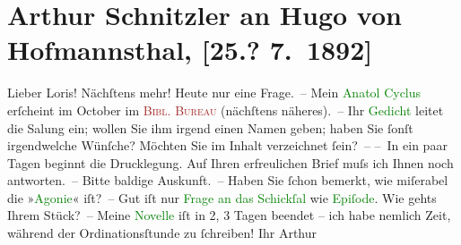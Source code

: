 

               \section[Arthur Schnitzler an Hugo von Hofmannsthal, {[}25.? 7. 1892{]}]{ Arthur Schnitzler an Hugo von Hofmannsthal, {[}25.? 7. 1892{]}}\nopagebreak{}\rehead{ }\normalsize\beginnumbering{} \toendnotes[C]{\smallbreak\pagebreak[2]} 
\toendnotes[C]{\smallbreak}\pstart
           \noindent{}{\pb}Lieber Loris! Nächſtens mehr! Heute nur
                    eine Frage. – Mein \textcolor{green}{Anatol Cyclus}{}\ledrightnote{\textcolor{green}{Anatol}} erſcheint im
                        October im \textcolor{brown}{\textsc{Bibl. Bureau}}{}\ledrightnote{\textcolor{brown}{Bibliographisches Bureau}} (nächſtens näheres). – Ihr \textcolor{green}{Gedicht}{} leitet die Sa{\geminationm}lung ein; wollen
                    Sie ihm irgend einen Namen geben; haben Sie ſonſt irgendwelche Wünſche? Möchten
                    Sie im {\pb}Inhalt verzeichnet ſein? –\pend
           \pstart
           – In ein paar Tagen beginnt die Drucklegung.\pend
           \pstart
           Auf Ihren erfreulichen Brief muſs ich Ihnen noch antworten. – Bitte baldige
                    Auskunft. – Haben Sie ſchon bemerkt, wie miſerabel die »\textcolor{green}{Agonie}{}\ledrightnote{\textcolor{green}{Agonie}}« iſt? – Gut iſt nur {\pb}\textcolor{green}{Frage an das Schickſal}{}\ledrightnote{\textcolor{green}{Die Frage an das Schicksal}} wie \textcolor{green}{Epiſode}{}\ledrightnote{\textcolor{green}{Episode}}.\pend
           \pstart
           Wie gehts Ihrem Stück? –\pend
           \pstart
           Meine \textcolor{green}{Novelle}{} iſt in 2, 3
                    Tagen beendet – ich habe nemlich Zeit, während der Ordinationsſtunde zu
                    ſchreiben!\pend
           \pstart Ihr \spacefill\mbox{Arthur}\pend{}\endnumbering{}  
      